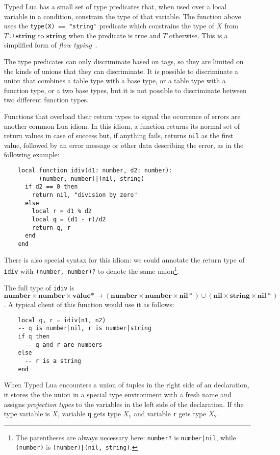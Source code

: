 \documentclass[preprint]{sig-alternate}
\newcommand{\Top}{\mathbf{value}}
\newcommand{\Nil}{\mathbf{nil}}
\newcommand{\Number}{\mathbf{number}}
\newcommand{\String}{\mathbf{string}}
\begin{document}
Typed Lua has a small set of type predicates that, when used
over a local variable in a condition, constrain the type of that
variable. The function above uses the {\tt type(X) == "string"}
predicate which constrains the type of $X$ from $T \cup \String$ to
$\String$ when the predicate is true and $T$ otherwise. This is
a simplified form of {\em flow typing}~\cite{guha:flow}.

The type predicates can only discriminate based on tags, so they
are limited on the kinds of unions that they can discriminate. It
is possible to discriminate a union that combines a table type with
a base type, or a table type with a function type, or a two base types,
but it is not possible to discriminate between two different function
types.

Functions that overload their return types to signal the ocurrence
of errors are another common Lua idiom. In this idiom, a function
returns its normal set of return values in case of success but,
if anything fails, returns {\tt nil} as the first value, followed
by an error message or other data describing the error, as in the
following example:

\begin{verbatim}
    local function idiv(d1: number, d2: number):
          (number, number)|(nil, string)
      if d2 == 0 then
        return nil, "division by zero"
      else
        local r = d1 % d2
        local q = (d1 - r)/d2
        return q, r
      end
    end
\end{verbatim}

There is also special syntax for this idiom: we could
annotate the return type of {\tt idiv} with {\tt (number, number)?}
to denote the same union\footnote{The parentheses are always
necessary here: {\tt number?} is {\tt number|nil}, while {\tt (number)}
is {\tt (number)|(nil, string)}.}. 

The full type of {\tt idiv} is $\Number \times \Number \times
\Top * \rightarrow (\Number \times \Number \times \Nil *) \cup
(\Nil \times \String \times \Nil *)$. A typical client of this
function would use it as follows:

\begin{verbatim}
    local q, r = idiv(n1, n2)
    -- q is number|nil, r is number|string
    if q then
      -- q and r are numbers
    else
      -- r is a string
    end
\end{verbatim}

When Typed Lua encounters a union of tuples in the right side
of an declaration, it stores the the union in a special type
environment with a fresh name and assigns {\em projection types} 
to the variables in the left side of the declaration. If the type
variable is $X$, variable {\tt q} gets type $X_1$ and variable
{\tt r} gets type $X_2$.
\end{document}
